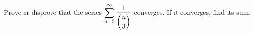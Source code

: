 Prove or disprove that the series $\displaystyle\sum_{n=3}^{\infty}\dfrac{1}{\dbinom{n}{3}}$ converges. If it converges, find its sum.
